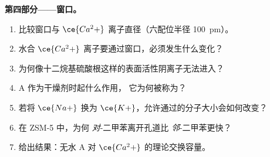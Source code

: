 \begin{problem}
\medskip\noindent\textbf{第四部分——窗口。}
\begin{enumerate}[resume]
  \item 比较窗口与 $\ce{Ca^2+}$ 离子直径（六配位半径
        \qty{100}{pm}）。
  \item 水合 $\ce{Ca^2+}$ 离子要通过窗口，必须发生什么变化？
  \item 为何像十二烷基硫酸根这样的表面活性阴离子无法进入？
  \item {} A 作为干燥剂时起什么作用，
        它为何被称为？
  \item 若将 $\ce{Na+}$ 换为 $\ce{K+}$，允许通过的分子大小会如何改变？
  \item 在 ZSM-5 中，为何 \textit{对}-二甲苯离开孔道比 \textit{邻}-二甲苯更快？
  \item 给出结果：无水 A 对
        $\ce{Ca^2+}$ 的理论交换容量。
\end{enumerate}
\end{problem}
